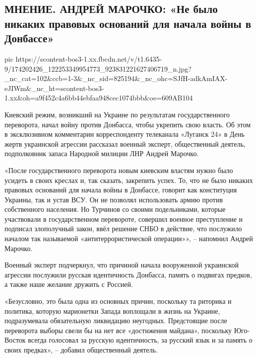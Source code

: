  
 
 
 
 

\subsection{МНЕНИЕ. АНДРЕЙ МАРОЧКО: «Не было никаких правовых оснований для начала войны в Донбассе»  }
\label{sec:14_04_2021.fb.respublikalnr.4.vojna_nachalo_marochko_mnenie}

\ifcmt
  pic https://scontent-bos3-1.xx.fbcdn.net/v/t1.6435-9/174202426_122253349954773_923831221627406719_n.jpg?_nc_cat=102&ccb=1-3&_nc_sid=825194&_nc_ohc=SJfH-adkAmIAX-eJIWm&_nc_ht=scontent-bos3-1.xx&oh=a9f452c4a6bb44ebfaa948cec1074bbb&oe=609AB104
\fi

Киевский режим, возникший на Украине по результатам государственного
переворота, начал войну против Донбасса, чтобы укрепить свою власть. Об этом в
эксклюзивном комментарии корреспонденту телеканала «Луганск 24» в День жертв
украинской агрессии рассказал военный эксперт, общественный деятель,
подполковник запаса Народной милиции ЛНР Андрей Марочко.

«После государственного переворота новым киевским властям нужно было усидеть в
своих креслах и, так сказать, закрепить успех. То, что не было никаких правовых
оснований для начала войны в Донбассе, говорит как конституция Украины, так и
устав ВСУ. Он не позволял использовать армию против собственного населения. Но
Турчинов со своими подельниками, которые участвовали в государственном
перевороте, совершил военное преступление и подписал злополучный закон, ввёл
решение СНБО в действие, что послужило началом так называемой
«антитеррористической операции»», – напомнил Андрей Марочко.

Военный эксперт подчеркнул, что причиной начала вооруженной украинской агрессии
послужили русская идентичность Донбасса, память о подвигах предков, а также
наше желание дружить с Россией.

«Безусловно, это была одна из основных причин, поскольку та риторика и
политика, которую марионетки Запада воплощали в жизнь на Украине, подразумевала
обязательную ликвидацию неугодных. Предстоящие после переворота выборы свели бы
на нет все «достижения майдана», поскольку Юго-Восток всегда голосовал за
русскую идентичность, за русский язык и за память о своих предках», – добавил
общественный деятель.


